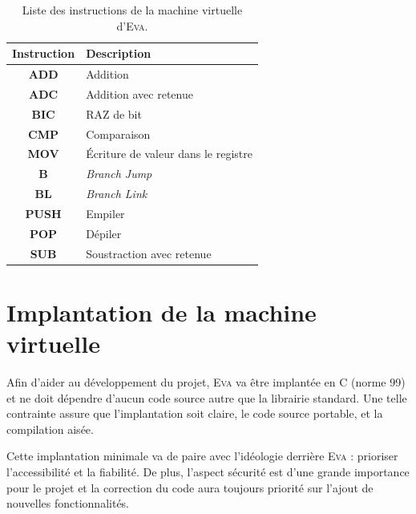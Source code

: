 \documentclass[11pt]{article}
\newcommand{\noun}[1]{\textsc{#1}}
\begin{document}
\begin{table}[tb]
  \begin{centering}
    \begin{tabular}{|c|l|}
      \hline
      \textbf{Instruction} & \textbf{Description}                \\
      \hline
      \hline
      \textbf{ADD}         & Addition                            \\
      \hline
      \textbf{ADC}         & Addition avec retenue               \\
      \hline
      \textbf{BIC}         & RAZ de bit                          \\
      \hline
      \textbf{CMP}         & Comparaison                         \\
      \hline
      \textbf{MOV}         & Écriture de valeur dans le registre \\
      \hline
      \textbf{B}           & \emph{Branch Jump}                  \\
      \hline
      \textbf{BL}          & \emph{Branch Link}                  \\
      \hline
      \textbf{PUSH}        & Empiler                             \\
      \hline
      \textbf{POP}         & Dépiler                             \\
      \hline
      \textbf{SUB}         & Soustraction avec retenue           \\
      \hline
    \end{tabular}
    \par\end{centering}
  \caption{Liste des instructions de la machine virtuelle d'\noun{Eva}.}
  \label{tab:instructions}
\end{table}


\section{Implantation de la machine virtuelle}

Afin d'aider au développement du projet, \noun{Eva} va être implantée
en C (norme 99) et ne doit dépendre d'aucun code source autre que
la librairie standard. Une telle contrainte assure que l'implantation
soit claire, le code source portable, et la compilation aisée.

Cette implantation minimale va de paire avec l'idéologie derrière
\noun{Eva} : prioriser l'accessibilité et la fiabilité. De plus, l'aspect
sécurité est d'une grande importance pour le projet et la correction
du code aura toujours priorité sur l'ajout de nouvelles fonctionnalités.
\end{document}
